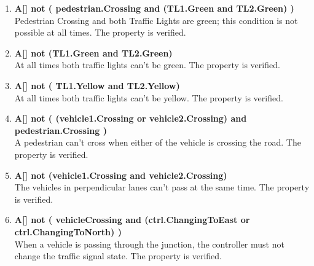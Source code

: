 \documentclass[conference]{IEEEtran}
\begin{document}
\begin{enumerate}
    \item \textbf{A[] not ( pedestrian.Crossing and (TL1.Green and TL2.Green) )}
    \\
    Pedestrian Crossing and both Traffic Lights are green; this condition is not possible at all times. The property is verified.
    \\
    \item \textbf{A[] not (TL1.Green and TL2.Green)}
    \\
    At all times both traffic lights can’t be green. The property is verified.
    \\
    \item \textbf{A[] not ( TL1.Yellow and TL2.Yellow)}
    \\
    At all times both traffic lights can’t be yellow. The property is verified.
    \\
    \item \textbf{A[] not ( (vehicle1.Crossing or vehicle2.Crossing) and pedestrian.Crossing )}
    \\
    A pedestrian can’t cross when either of the vehicle is crossing the road. The property is verified.
    \\
    \item \textbf{A[] not (vehicle1.Crossing and vehicle2.Crossing)}
    \\
    The vehicles in perpendicular lanes can’t pass at the same time. The property is verified.
    \\
    \item \textbf{A[] not ( vehicleCrossing and (ctrl.ChangingToEast or ctrl.ChangingToNorth) )}
    \\
    When a vehicle is passing through the junction, the controller must not change the traffic signal state. The property is verified.
\end{enumerate}
\ \\
\end{document}
